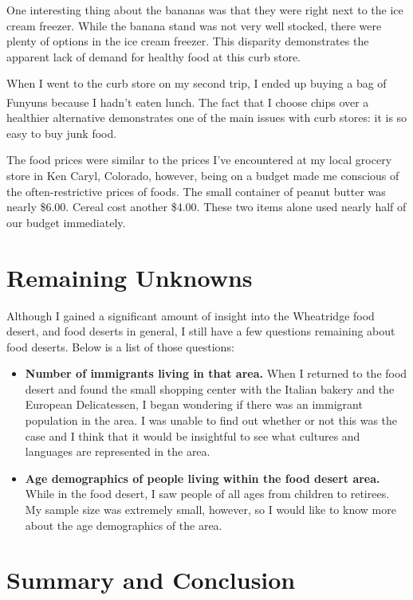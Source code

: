 \documentclass[11pt]{article}
\begin{document}
One interesting thing about the bananas was that they were right next to the ice cream freezer.
While the banana stand was not very well stocked, there were plenty of options in the ice cream
freezer. This disparity demonstrates the apparent lack of demand for healthy food at this curb
store.

When I went to the curb store on my second trip, I ended up buying a bag of
Funyuns\textsuperscript{\textregistered} because I hadn't eaten lunch. The fact that I choose chips
over a healthier alternative demonstrates one of the main issues with curb stores: it is so easy to
buy junk food.

The food prices were similar to the prices I've encountered at my local grocery store in Ken Caryl,
Colorado, however, being on a budget made me conscious of the often-restrictive prices of foods. The
small container of peanut butter was nearly \$6.00. Cereal cost another \$4.00. These two items
alone used nearly half of our budget immediately.

\section{Remaining Unknowns}
Although I gained a significant amount of insight into the Wheatridge food desert, and food deserts
in general, I still have a few questions remaining about food deserts. Below is a list of those
questions:

\begin{itemize}
    \item \textbf{Number of immigrants living in that area.} When I returned to the food desert and
        found the small shopping center with the Italian bakery and the European Delicatessen, I
        began wondering if there was an immigrant population in the area. I was unable to find out
        whether or not this was the case and I think that it would be insightful to see what
        cultures and languages are represented in the area.

    \item \textbf{Age demographics of people living within the food desert area.} While in the food
        desert, I saw people of all ages from children to retirees. My sample size was extremely
        small, however, so I would like to know more about the age demographics of the area.
\end{itemize}

\pagebreak
\section{Summary and Conclusion}
\end{document}

